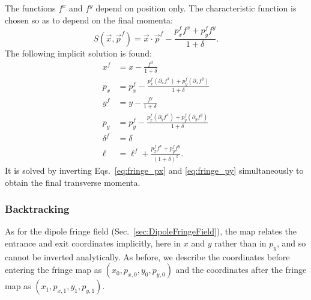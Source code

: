 The functions $f^x$ and $f^y$ depend on position only.
The characteristic function is chosen so as to depend on the final momenta:
\begin{equation}
S(\vec{x}, \vec{p}^f) = \vec{x} \cdot \vec{p}^f - \frac{p_x^f f^x + p_y^f f^y}{1+\delta}.
\label{eq:characteristic}
\end{equation}
The following implicit solution is found:
\begin{subequations}
\label{eq:system}
\begin{align}
x^f &= x - \frac{f^x}{1+\delta} \label{eq:xf} \\[0.5ex]
p_x &= p_x^f - \frac{p_x^f (\partial_x f^x) + p_y^f (\partial_x f^y)}{1+\delta} \label{eq:fringe_px} \\[0.5ex]
y^f &= y - \frac{f^y}{1+\delta} \label{eq:yf} \\[0.5ex]
p_y &= p_y^f - \frac{p_x^f (\partial_y f^x) + p_y^f (\partial_y f^y)}{1+\delta} \label{eq:fringe_py} \\[0.5ex]
\delta^f &= \delta \label{eq:deltaf} \\[0.5ex]
\ell &= \ell^f + \frac{p_x^f f^x + p_y^f f^y}{(1+\delta)^2}. \label{eq:l}
\end{align}
\end{subequations}
It is solved by inverting Eqs.~\eqref{eq:fringe_px} and \eqref{eq:fringe_py}
simultaneously to obtain the final transverse momenta.

\subsubsection{Backtracking}
As for the dipole fringe field (Sec.~\ref{sec:DipoleFringeField}), the map relates the
entrance and exit coordinates implicitly, here in $x$ and $y$ rather than in $p_y$, and so
cannot be inverted analytically. As before, we describe the coordinates before entering the
fringe map as $(x_0, p_{x,0}, y_0, p_{y,0})$ and the coordinates after the fringe map as
$(x_1, p_{x,1}, y_1, p_{y,1})$.

